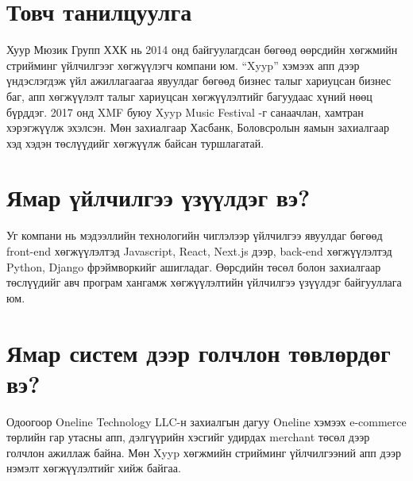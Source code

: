 \section{Товч танилцуулга}
	\quad \quad	Хуур Мюзик Групп ХХК нь 2014 онд байгуулагдсан бөгөөд өөрсдийн хөгжмийн стрийминг үйлчилгээг хөгжүүлэгч компани юм. “Xyyp” хэмээх апп дээр үндэслэгдэж үйл ажиллагаагаа явуулдаг бөгөөд бизнес талыг хариуцсан бизнес баг, апп хөгжүүлэлт талыг хариуцсан хөгжүүлэлтийг багуудаас хүний нөөц бүрддэг. 2017 онд XMF буюу Xyyp Music Festival -г санаачлан, хамтран хэрэгжүүлж эхэлсэн. Мөн захиалгаар Хасбанк, Боловсролын яамын захиалгаар хэд хэдэн төслүүдийг хөгжүүлж байсан туршлагатай.

\section{Ямар үйлчилгээ үзүүлдэг вэ?}
	\quad \quad	Уг компани нь мэдээллийн технологийн чиглэлээр үйлчилгээ явуулдаг бөгөөд front-end хөгжүүлэлтэд Javascript, React, Next.js дээр, back-end хөгжүүлэлтэд Python, Django фрэймворкийг ашигладаг. Өөрсдийн төсөл болон захиалгаар төслүүдийг авч програм хангамж хөгжүүлэлтийн үйлчилгээ үзүүлдэг байгууллага юм. 
     

\section{Ямар систем дээр голчлон төвлөрдөг вэ? }
	\quad \quad	Одоогоор Oneline Technology LLC-н захиалгын дагуу Oneline хэмээх e-commerce төрлийн гар утасны апп, дэлгүүрийн хэсгийг удирдах merchant төсөл дээр голчлон ажиллаж байна. Мөн Xyyp хөгжмийн стрийминг үйлчилгээний апп дээр нэмэлт хөгжүүлэлтийг хийж байгаа.

